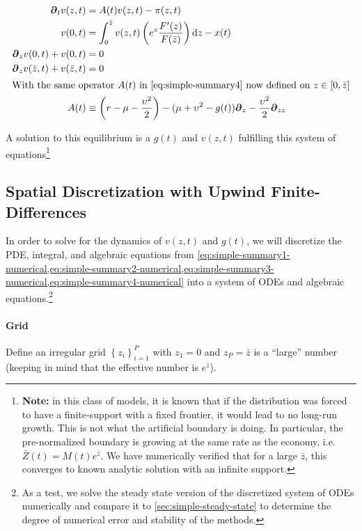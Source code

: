 \documentclass[11pt]{article}
\newcommand{\D}[1][]{\ensuremath{\boldsymbol{\partial}_{#1}}}
\newcommand{\diff}{\ensuremath{\mathrm{d}}}
\newcommand{\set}[1]{\ensuremath{\left\{{#1}\right\}}}
\begin{document}
\begin{align}
\D[t]v(z,t) &= A(t)v(z,t) - \pi(z,t)\label{eq:simple-summary1-numerical}\\
v(0,t) &= \int_{0}^{\bar{z}}  v(z,t) \left(e^z \frac{F'(z)}{F(\bar{z})}\right) \diff z - x(t)\label{eq:simple-summary2-numerical}\\
\D[z]v(0,t) + v(0,t) &= 0\label{eq:simple-summary3-numerical}\\
\D[z]v(\bar{z},t) + v(\bar{z},t) &= 0\label{eq:simple-summary4-numerical}\\
\intertext{With the same operator $A(t)$ in \cref{eq:simple-summary4} now defined on $z \in [0,\bar{z}]$}
A(t) &\equiv \left(r - \mu - \frac{\upsilon^2}{2}\right) - (\mu+ \upsilon^2 - g(t)) \D[z] - \frac{\upsilon^2}{2} \D[zz]\label{eq:simple-summary5-numerical}
\end{align}

\noindent A solution to this equilibrium is a $g(t)$ and $v(z,t)$ fulfilling this system of equations\footnote{\textbf{Note:} in this class of models, it is known that if the distribution was forced to have a finite-support with a fixed frontier, it would lead to no long-run growth.  This is not what the artificial boundary is doing.  In particular, the pre-normalized boundary is growing at the same rate as the economy, i.e. $\bar{Z}(t) = M(t) e^{\bar{z}}$.  We have numerically verified that for a large $\bar{z}$, this converges to known analytic solution with an infinite support.}

\subsection{Spatial Discretization with Upwind Finite-Differences}

In order to solve for the dynamics of $v(z,t)$ and $g(t)$, we will discretize the PDE, integral, and algebraic equations from \cref{eq:simple-summary1-numerical,eq:simple-summary2-numerical,eq:simple-summary3-numerical,eq:simple-summary4-numerical} into a system of ODEs and algebraic equations.\footnote{As a test, we solve the steady state version of the discretized system of ODEs numerically and compare it to \cref{sec:simple-steady-state} to determine the degree of numerical error and stability of the methods.}


\paragraph{Grid}

Define an irregular grid $\set{z_i}_{i=1}^P$ with $z_1 = 0$ and $z_P = \bar{z}$ is a ``large'' number (keeping in mind that the effective number is $e^{\bar{z}}$).
\end{document}
